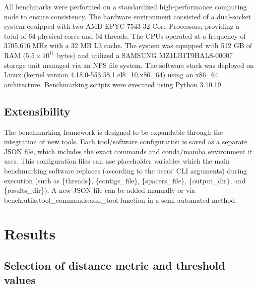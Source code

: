 \documentclass[
]{article}
\begin{document}
All benchmarks were performed on a standardized high-performance
computing node to ensure consistency. The hardware environment consisted
of a dual-socket system equipped with two AMD EPYC 7543 32-Core
Processors, providing a total of 64 physical cores and 64 threads. The
CPUs operated at a frequency of 3705.616 MHz with a 32 MB L3 cache. The
system was equipped with 512 GB of RAM (\(5.5\times 10^{11}\) bytes) and
utilized a SAMSUNG MZ1LB1T9HALS-00007 storage unit managed via an NFS
file system. The software stack was deployed on Linux (kernel version
4.18.0-553.58.1.el8\_10.x86\_64) using an x86\_64 architecture.
Benchmarking scripts were executed using Python 3.10.19.

\subsection{Extensibility}\label{sec-extensibility}

The benchmarking framework is designed to be expandable through the
integration of new tools. Each tool/software configuration is saved as a
separate JSON file, which includes the exact commands and conda/mamba
environment it uses. This configuration files can use placeholder
variables which the main benchmarking software replaces (according to
the users' CLI arguments) during execution (such as \{threads\},
\{contigs\_file\}, \{spacers\_file\}, \{output\_dir\}, and
\{results\_dir\}). A new JSON file can be added manually or via
bench.utils.tool\_commands:add\_tool function in a semi automated
method.

\section{Results}\label{sec-results}

\subsection{Selection of distance metric and threshold
values}\label{sec-distance-metric-selection}
\end{document}
